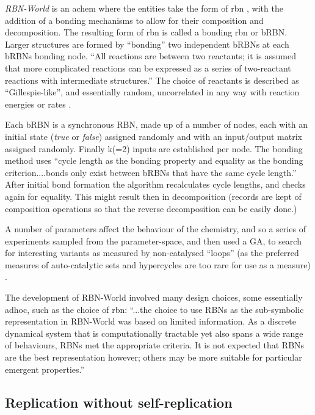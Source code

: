 \emph{RBN-World} \parencite{Faulconbridge2011} is an \gls{achem} where the entities take the form of \gls{rbn} \parencite{Kauffman:1969ne}, with the addition of a bonding mechanisms to allow for their composition and decomposition. The resulting form of \gls{rbn} is called a bonding \gls{rbn} or bRBN.  Larger structures are formed by ``bonding'' two independent bRBNs at each bRBNs bonding node. ``All reactions are between two reactants; it is assumed that more complicated reactions can be expressed as a series of two-reactant reactions with intermediate structures.'' The choice of reactants is described as ``Gillespie-like'', and essentially random, uncorrelated in any way with reaction energies or rates \parencite[chap.8]{Faulconbridge2011}.

Each bRBN is a synchronous RBN, made up of a number of nodes, each with an initial state (\emph{true} or \emph{false}) assigned randomly and with an input/output matrix assigned randomly. Finally k(=2) inputs are established per node. The bonding method uses ``cycle length as the bonding property and equality as the bonding criterion....bonds only exist between bRBNs that have the same cycle length.'' After initial bond formation the algorithm recalculates cycle lengths, and checks again for equality. This might result then in decomposition (records are kept of composition operations so that the reverse decomposition can be easily done.)

A number of parameters affect the behaviour of the chemistry, and so a series of experiments sampled from the parameter-space, and then used a GA, to search for interesting variants as measured by non-catalysed ``loops'' (as the preferred measures of auto-catalytic sets and \glspl{hypercycle} are too rare for use as a measure) \parencite[chap.8]{Faulconbridge2011}. 

The development of RBN-World involved many design choices, some essentially adhoc, such as the choice of \gls{rbn}: ``...the choice to use RBNs as the sub-symbolic representation in RBN-World was based on limited information. As a discrete dynamical system that is computationally tractable yet also spans a wide range of behaviours, RBNs met the appropriate criteria. It is not expected that RBNs are the best representation however; others may be more suitable for particular emergent properties.'' \parencite[p. 192]{Faulconbridge2011}

\subsection{Replication without self-replication}


